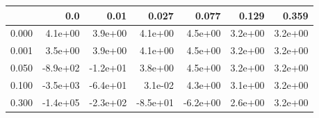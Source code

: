\begin{tabular}{lrrrrrr}
\toprule
{} &      0.0 &     0.01 &    0.027 &    0.077 &   0.129 &   0.359 \\
\midrule
0.000 &  4.1e+00 &  3.9e+00 &  4.1e+00 &  4.5e+00 & 3.2e+00 & 3.2e+00 \\
0.001 &  3.5e+00 &  3.9e+00 &  4.1e+00 &  4.5e+00 & 3.2e+00 & 3.2e+00 \\
0.050 & -8.9e+02 & -1.2e+01 &  3.8e+00 &  4.5e+00 & 3.2e+00 & 3.2e+00 \\
0.100 & -3.5e+03 & -6.4e+01 &  3.1e-02 &  4.3e+00 & 3.1e+00 & 3.2e+00 \\
0.300 & -1.4e+05 & -2.3e+02 & -8.5e+01 & -6.2e+00 & 2.6e+00 & 3.2e+00 \\
\bottomrule
\end{tabular}
